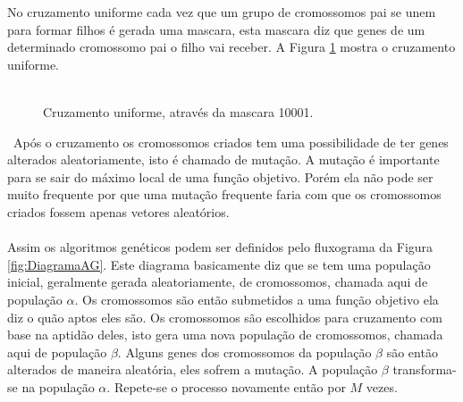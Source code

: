 \documentclass[10pt,a4paper]{article}
\begin{document}
No cruzamento uniforme cada vez que um grupo de cromossomos pai se unem para formar filhos é gerada uma mascara, esta mascara diz que genes de um determinado cromossomo pai o filho vai receber. A Figura \ref{fig:MostrandoOCruzamentoUniforme} mostra o cruzamento uniforme. \\ \\
\begin{figure}[H]
  \center
  \caption{Cruzamento uniforme, através da mascara 10001.}
  \label{fig:MostrandoOCruzamentoUniforme}
\end{figure} \
Após o cruzamento os cromossomos criados tem uma possibilidade de ter genes alterados aleatoriamente, isto é chamado de mutação. A mutação é importante para se sair do máximo local de uma função objetivo. Porém ela não pode ser muito frequente por que uma mutação frequente faria com que os cromossomos criados fossem apenas vetores aleatórios.\\ \\
Assim os algoritmos genéticos podem ser definidos pelo fluxograma da Figura \ref{fig:DiagramaAG}. Este diagrama basicamente diz que se tem uma população inicial, geralmente gerada aleatoriamente, de cromossomos, chamada aqui de população $\alpha$.  Os cromossomos são então submetidos a uma função objetivo ela diz o quão aptos eles são. Os cromossomos são escolhidos para cruzamento com base na aptidão deles, isto gera uma nova população de cromossomos, chamada aqui de população $\beta$. Alguns genes dos cromossomos da população $\beta$ são então alterados de maneira aleatória, eles sofrem a mutação. A população $\beta$ transforma-se na população $\alpha$. Repete-se o processo novamente então por $M$ vezes.
\end{document}
